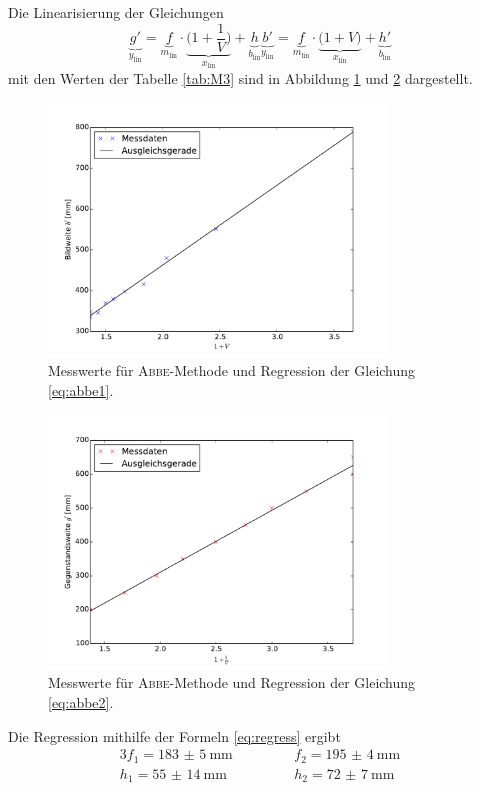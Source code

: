 Die Linearisierung der Gleichungen
\begin{subequations}
\begin{equation}
	\underbrace{g'}_{y_\text{lin}}=\underbrace{f}_{m_\text{lin}}\cdot\underbrace{\bigl(1+\frac{1}{V}\bigr)}_{x_\text{lin}}+\underbrace{h}_{b_\text{lin}}
	\label{eq:abbe1}
	\end{equation}
	\begin{equation}
	\underbrace{b'}_{y_\text{lin}}=\underbrace{f}_{m_\text{lin}}\cdot\underbrace{\bigl(1+V\bigr)}_{x_\text{lin}}+\underbrace{h'}_{b_\text{lin}}
	\label{eq:abbe2}
\end{equation}
\end{subequations}
mit den Werten der Tabelle \ref{tab:M3} sind in Abbildung \ref{fig:abbe1} und \ref{fig:abbe2} dargestellt.

\begin{figure}[p]
	\centering
	\includegraphics[width=0.8\textwidth]{Bilder/Abbe2.pdf}
	\caption{Messwerte für \texorpdfstring{\textsc{Abbe}}{Abbe}-Methode und Regression der Gleichung \eqref{eq:abbe1}.}
	\label{fig:abbe1}
\end{figure}
\begin{figure}[p]
	\centering
	\includegraphics[width=0.8\textwidth]{Bilder/Abbe1.pdf}
	\caption{Messwerte für \texorpdfstring{\textsc{Abbe}}{Abbe}-Methode und Regression der Gleichung \eqref{eq:abbe2}.}
	\label{fig:abbe2}
\end{figure}

Die Regression mithilfe der Formeln \ref{eq:regress}
ergibt 
\begin{alignat}{3}
	f_1 = \SI{183(5)}{\milli\meter} & \qquad&&f_2 = \SI{195(4)}{\milli\meter} \\
	h_1 = \SI{55(14)}{\milli\meter} & \qquad&&h_2 = \SI{72(7)}{\milli\meter}
\end{alignat}
